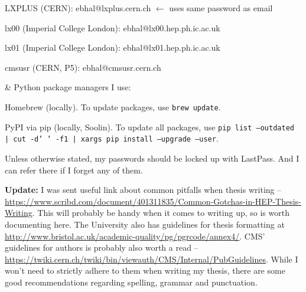 \begin{easylist}[itemize]
\quad LXPLUS (CERN): ebhal@lxplus.cern.ch $\leftarrow$ uses same password as email

\quad lx00 (Imperial College London): ebhal@lx00.hep.ph.ic.ac.uk

\quad lx01 (Imperial College London): ebhal@lx01.hep.ph.ic.ac.uk

\quad cmsusr (CERN, P5): ebhal@cmsusr.cern.ch


& Python package managers I use:

\quad Homebrew (locally). To update packages, use \texttt{brew update}.

\quad PyPI via pip (locally, Soolin). To update all packages, use \texttt{pip list --outdated | cut -d' ' -f1 | xargs pip install --upgrade --user}.

\end{easylist}


Unless otherwise stated, my passwords should be locked up with LastPass. And I can refer there if I forget any of them.

\textbf{Update:} I was sent useful link about common pitfalls when thesis writing -- \url{https://www.scribd.com/document/401311835/Common-Gotchas-in-HEP-Thesis-Writing}. This will probably be handy when it comes to writing up, so is worth documenting here. The University also has guidelines for thesis formatting at \url{http://www.bristol.ac.uk/academic-quality/pg/pgrcode/annex4/}. CMS' guidelines for authors is probably also worth a read -- \url{https://twiki.cern.ch/twiki/bin/viewauth/CMS/Internal/PubGuidelines}. While I won't need to strictly adhere to them when writing my thesis, there are some good recommendations regarding spelling, grammar and punctuation.
